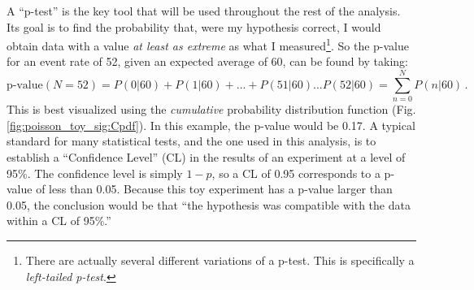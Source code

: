     A ``p-test'' is the key tool that will be used throughout the rest of the analysis.
    Its goal is to find the probability that, were my hypothesis correct,
        I would obtain data with a value \textit{at least as extreme} as what I measured\footnote{
            There are actually several different variations of a p-test.
            This is specifically a \textit{left-tailed p-test}.
        }.
    So the p-value for an event rate of 52, given an expected average of 60, can be found by taking:
    \begin{equation}
        \textrm{p-value}(N=52) = P(0|60) + P(1|60) + ... + P(51|60) ... P(52|60) = \sum\limits_{n=0}^N P(n|60)
        \,.
    \end{equation}
    This is best visualized using the \textit{cumulative} probability distribution function (Fig. \ref{fig:poisson_toy_sig:Cpdf}).
    In this example, the p-value would be 0.17.
    A typical standard for many statistical tests, and the one used in this analysis,
        is to establish a ``Confidence Level'' (CL) in the results of an experiment at a level of 95\%. 
    The confidence level is simply $1-p$, so a CL of 0.95 corresponds to a p-value of less than 0.05.
    Because this toy experiment has a p-value larger than 0.05,
        the conclusion would be that ``the hypothesis was compatible with the data within a CL of 95\%.''


